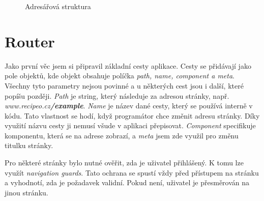 \begin{figure}
    \caption{Adresářová struktura} \label{fig:struktura}
\end{figure}

\section{Router}
Jako první věc jsem si připravil základní cesty aplikace. Cesty se přidávají jako pole objektů, kde objekt obsahuje políčka \emph{path, name, component \emph{a} meta}.
Všechny tyto parametry nejsou povinné a u některých cest jsou i další, které popíšu později. \emph{Path} je string, který následuje za adresou stránky, např.
\emph{www.recipeo.cz\textbf{/example}}. \emph{Name} je název dané cesty, který se používá interně v kódu. Tato vlastnost se hodí, když programátor chce změnit adresu stránky.
Díky využití názvu cesty ji nemusí všude v aplikaci přepisovat. \emph{Component} specifikuje komponentu, která se na adrese zobrazí, a \emph{meta} jsem zde využil pro změnu
titulku stránky.

Pro některé stránky bylo nutné ověřit, zda je uživatel přihlášený. K tomu lze využít \emph{navigation guards}. Tato ochrana se spustí
vždy před přístupem na stránku a vyhodnotí, zda je požadavek validní. Pokud není, uživatel je přesměrován na jinou stránku.

